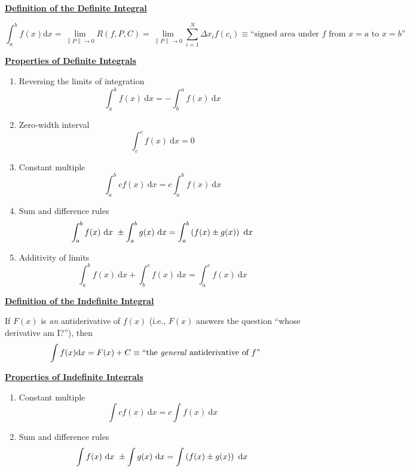 \documentclass{siproblemset}
\begin{document}
    \newpage
    
    \thispagestyle{empty}
    \begin{center}
        \textbf{\underline{Definition of the Definite Integral}}
    \end{center}
    $$\int_a^bf(x)\text{d}x=\lim\limits_{\left\lVert P \right\rVert\to 0}R(f,P,C)=\lim\limits_{\left\lVert P \right\rVert\to 0}\sum_{i=1}^{N}\Delta x_if(c_i)\equiv\text{``signed area under $f$ from $x=a$ to $x=b$''}$$
    
    \thispagestyle{empty}
    \begin{center}
        \textbf{\underline{Properties of Definite Integrals}}
    \end{center}
    \begin{multicols}{2}
        \begin{enumerate}
            \item Reversing the limits of integration
            $$\int_a^bf(x)~\text{d}x=-\int_b^af(x)~\text{d}x$$
            \item Zero-width interval
            $$\int_c^cf(x)~\text{d}x=0$$
            \item Constant multiple
            $$\int_a^bcf(x)~\text{d}x=c\int_a^bf(x)~\text{d}x$$
            \item Sum and difference rules
            $$\int_a^bf(x)~\text{d}x~\pm\int_a^bg(x)~\text{d}x=\int_a^b\paren{f(x)\pm g(x)}~\text{d}x$$
            \item Additivity of limits
            $$\int_a^bf(x)~\text{d}x+\int_b^cf(x)~\text{d}x=\int_a^cf(x)~\text{d}x$$
        \end{enumerate}
    \end{multicols}

    \thispagestyle{empty}
    \begin{center}
        \textbf{\underline{Definition of the Indefinite Integral}}
    \end{center}
    If $F(x)$ is \textit{an} antiderivative of $f(x)$ (i.e., $F(x)$ answers the question ``whose derivative am I?''), then
    $$\int f(x)\text{d}x=F(x)+C\equiv\text{``the \textit{general} antiderivative of $f$''}$$

    \thispagestyle{empty}
    \begin{center}
        \textbf{\underline{Properties of Indefinite Integrals}}
    \end{center}
    \begin{multicols}{2}
        \begin{enumerate}
            \item Constant multiple
            $$\int cf(x)~\text{d}x=c\int f(x)~\text{d}x$$
            \item Sum and difference rules
            $$\int f(x)~\text{d}x~\pm\int g(x)~\text{d}x=\int \paren{f(x)\pm g(x)}~\text{d}x$$
        \end{enumerate}
    \end{multicols}
\end{document}
